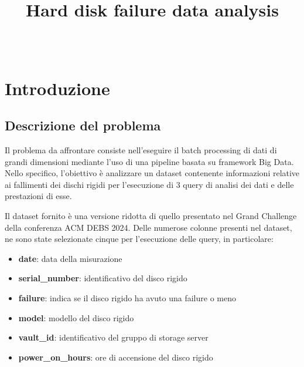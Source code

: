 \documentclass[conference]{IEEEtran}
\begin{document}
\title{Hard disk failure data analysis\\}

\author{
\and
{}
\\
}


\maketitle

\begin{abstract}
\end{abstract}

\section{Introduzione}
\subsection{Descrizione del problema}
Il problema da affrontare consiste nell'eseguire il batch processing di dati di grandi dimensioni mediante l'uso di una pipeline basata su framework Big Data. Nello specifico, l'obiettivo è analizzare un dataset contenente informazioni relative ai fallimenti dei dischi rigidi per l'esecuzione di 3 query di analisi dei dati e delle prestazioni di esse.

Il dataset fornito è una versione ridotta di quello presentato nel Grand Challenge della conferenza ACM DEBS 2024. Delle numerose colonne presenti nel dataset, ne sono state selezionate cinque per l'esecuzione delle query, in particolare:
\begin{itemize}
    \item \textbf{date}: data della misurazione
    \item \textbf{serial\_number}: identificativo del disco rigido
    \item \textbf{failure}: indica se il disco rigido ha avuto una failure o meno
    \item \textbf{model}: modello del disco rigido
    \item \textbf{vault\_id}: identificativo del gruppo di storage server
    \item \textbf{power\_on\_hours}: ore di accensione del disco rigido
\end{itemize}
\end{document}
